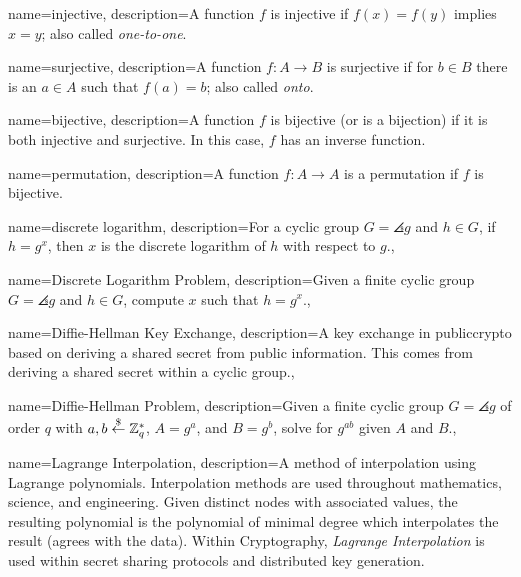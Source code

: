 {
    name={injective},
    description={A function $f$ is injective if $f(x) = f(y)$
        implies $x=y$; also called \emph{one-to-one}.}
}

{
    name={surjective},
    description={A function $f:A\to B$ is surjective if for $b\in B$
        there is an $a\in A$ such that $f(a)=b$; also called \emph{onto}.}
}

{
    name={bijective},
    description={A function $f$ is bijective (or is a bijection) if it is
        both \gls{injective} and \gls{surjective}.
        In this case, $f$ has an inverse function.}
}

{
    name={permutation},
    description={A function $f:A\to A$ is a permutation if $f$
        is \gls{bijective}.}
}

{
    name={discrete logarithm},
    description={For a \gls{cyclic group} $G = \angles{g}$
        and $h\in G$, if $h = g^{x}$, then $x$ is the discrete logarithm
        of $h$ with respect to $g$.},
}

{
    name={Discrete Logarithm Problem},
    description={Given a \gls{finite cyclic group} $G = \angles{g}$
        and $h\in G$, compute $x$ such that $h = g^{x}$.},
}

{
    name={Diffie-Hellman Key Exchange},
    description={A key exchange in \gls{publiccrypto}
        based on deriving a \gls{shared secret} from public information.
        This comes from deriving a \gls{shared secret} within a
        \gls{cyclic group}.},
}

{
    name={Diffie-Hellman Problem},
    description={Given a \gls{finite cyclic group} $G = \angles{g}$
        of order $q$ with $a,b\stackrel{\$}{\leftarrow}{}\mathbb{Z}_{q}^{*}$,
        $A=g^{a}$, and $B=g^{b}$,
        solve for $g^{ab}$ given $A$ and $B$.},
}

{
    name={Lagrange Interpolation},
    description={A method of interpolation using Lagrange polynomials.
        Interpolation methods are used throughout mathematics, science,
        and engineering.
        Given distinct nodes with associated values,
        the resulting polynomial is the polynomial of minimal degree
        which interpolates the result (agrees with the data).
        Within Cryptography, \emph{Lagrange Interpolation} is used
        within secret sharing protocols and \gls{distributed key generation}.}
}

